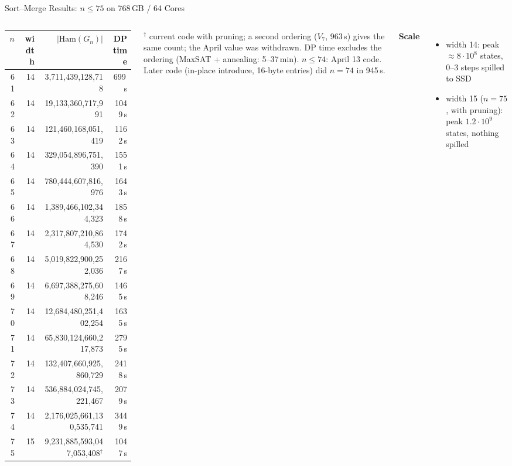 \documentclass[aspectratio=169,t]{beamer}
\begin{document}
\begin{frame}{Sort--Merge Results: $n\le 75$ on 768\,GB / 64 Cores}
\footnotesize
\begin{columns}[c]
\centering
{\scriptsize
\renewcommand{\arraystretch}{0.92}
\begin{tabular}{rrrr}
\toprule
$n$ & width & $|\mathrm{Ham}(G_n)|$ & DP time \\
\midrule
61 & 14 & 3{,}711{,}439{,}128{,}718 & 699\,s \\
62 & 14 & 19{,}133{,}360{,}717{,}991 & 1049\,s \\
63 & 14 & 121{,}460{,}168{,}051{,}419 & 1162\,s \\
64 & 14 & 329{,}054{,}896{,}751{,}390 & 1551\,s \\
65 & 14 & 780{,}444{,}607{,}816{,}976 & 1643\,s \\
66 & 14 & 1{,}389{,}466{,}102{,}344{,}323 & 1858\,s \\
67 & 14 & 2{,}317{,}807{,}210{,}864{,}530 & 1742\,s \\
68 & 14 & 5{,}019{,}822{,}900{,}252{,}036 & 2167\,s \\
69 & 14 & 6{,}697{,}388{,}275{,}608{,}246 & 1465\,s \\
70 & 14 & 12{,}684{,}480{,}251{,}402{,}254 & 1635\,s \\
71 & 14 & 65{,}830{,}124{,}660{,}217{,}873 & 2795\,s \\
72 & 14 & 132{,}407{,}660{,}925{,}860{,}729 & 2418\,s \\
73 & 14 & 536{,}884{,}024{,}745{,}221{,}467 & 2079\,s \\
74 & 14 & 2{,}176{,}025{,}661{,}130{,}535{,}741 & 3449\,s \\
\rowcolor{accent!12}
75 & 15 & 9{,}231{,}885{,}593{,}047{,}053{,}408$^\dagger$ & 1047\,s \\
\bottomrule
\end{tabular}}

\vspace{0.05cm}
{\tiny $^\dagger$ current code with pruning; a second ordering ($V_7$, 963\,s) gives the same count; the April value was withdrawn. DP time excludes the ordering
(MaxSAT + annealing: 5--37\,min). $n\le 74$: April 13 code. Later code (in-place
introduce, 16-byte entries) did $n=74$ in 945\,s.}

\textbf{Scale}
\begin{itemize}
  \item width 14: peak $\approx 8\cdot10^8$ states, 0--3 steps spilled to SSD
  \item width 15 ($n=75$, with pruning): peak $1.2\cdot10^9$ states,
        nothing spilled
\end{itemize}


\end{columns}
\end{frame}
\end{document}
